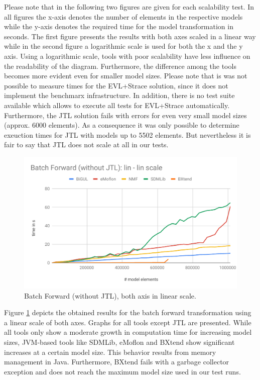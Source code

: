 Please note that in the following two figures are given for each scalability test. In all figures the x-axis denotes the number of elements in the respective models while the y-axis denotes the required time for the model transformation in seconds. The first figure presents the results with both axes scaled in a linear way while in the second figure a logarithmic scale is used for both the x and the y axis. Using a logarithmic scale, tools with poor scalability have less influence on the readability of the diagram. Furthermore, the difference among the tools becomes more evident even for smaller model sizes.
Please note that is was not possible to measure times for the EVL+Strace solution, since it does not implement the benchmarx infrastructure. In addition, there is no test suite available which allows to execute all tests for EVL+Strace automatically. Furthermore, the JTL solution fails with errors for even very small model sizes (approx. 6000 elements). As a consequence it was only possible to determine exeuction times for JTL with models up to 5502 elements. But nevertheless it is fair to say that JTL does not scale at all in our tests.


\begin{figure}[h!]
	\centering
	\includegraphics[width=\columnwidth]{diagrams/scalability/BFlinlin}
	\caption{Batch Forward (without JTL), both axis in linear scale.}
	\label{fig:scalabilityBatchFWDlin}
\end{figure}

Figure \ref{fig:scalabilityBatchFWDlin} depicts the obtained results for the batch forward transformation using a linear scale of both axes. Graphs for all tools except JTL are presented. While all tools only show a moderate growth in computation time for increasing model sizes, JVM-based tools like SDMLib, eMoflon and BXtend show significant increases at a certain model size. This behavior results from memory management in Java. Furthermore, BXtend fails with a garbage collector exception and does not reach the maximum model size used in our test runs. 

